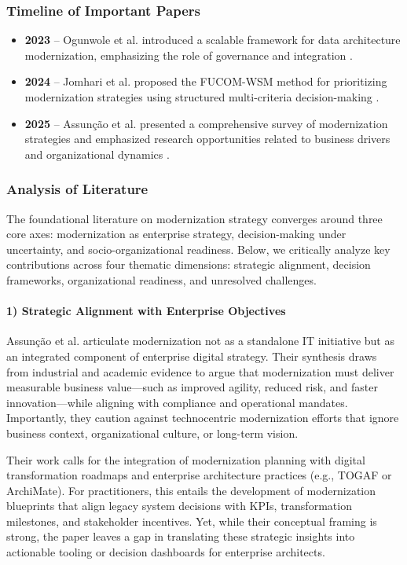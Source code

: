 \documentclass[12pt]{article}
\begin{document}
\subsubsection{Timeline of Important Papers}

\begin{itemize}
    \item \textbf{2023} – Ogunwole et al. introduced a scalable framework for data architecture modernization, emphasizing the role of governance and integration \cite{ogunwole2023}.
    \item \textbf{2024} – Jomhari et al. proposed the FUCOM-WSM method for prioritizing modernization strategies using structured multi-criteria decision-making \cite{jomhari2024}.
    \item \textbf{2025} – Assunção et al. presented a comprehensive survey of modernization strategies and emphasized research opportunities related to business drivers and organizational dynamics \cite{assuncao2025}.
\end{itemize}
\subsubsection{Analysis of Literature}

The foundational literature on modernization strategy converges around three core axes: modernization as enterprise strategy, decision-making under uncertainty, and socio-organizational readiness. Below, we critically analyze key contributions across four thematic dimensions: strategic alignment, decision frameworks, organizational readiness, and unresolved challenges.

\paragraph{1) Strategic Alignment with Enterprise Objectives}

Assunção et al. \cite{assuncao2025} articulate modernization not as a standalone IT initiative but as an integrated component of enterprise digital strategy. Their synthesis draws from industrial and academic evidence to argue that modernization must deliver measurable business value—such as improved agility, reduced risk, and faster innovation—while aligning with compliance and operational mandates. Importantly, they caution against technocentric modernization efforts that ignore business context, organizational culture, or long-term vision.

Their work calls for the integration of modernization planning with digital transformation roadmaps and enterprise architecture practices (e.g., TOGAF or ArchiMate). For practitioners, this entails the development of modernization blueprints that align legacy system decisions with KPIs, transformation milestones, and stakeholder incentives. Yet, while their conceptual framing is strong, the paper leaves a gap in translating these strategic insights into actionable tooling or decision dashboards for enterprise architects.
\end{document}
